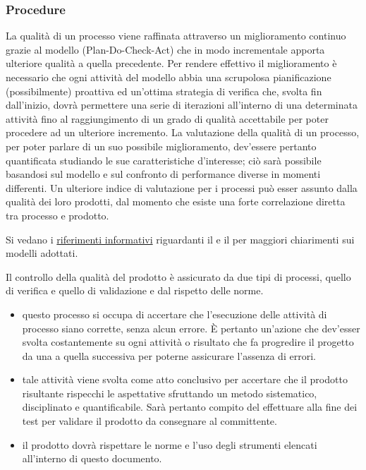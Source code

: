 \documentclass[a4paper, titlepage]{article}
\begin{document}
\subsubsection{Procedure}

La qualità di un processo viene raffinata attraverso un miglioramento continuo grazie al modello  (Plan-Do-Check-Act) che in modo incrementale apporta ulteriore qualità a quella precedente. Per rendere effettivo il miglioramento è necessario che ogni attività del modello abbia una scrupolosa pianificazione (possibilmente) proattiva ed un'ottima strategia di verifica che, svolta fin dall'inizio, dovrà permettere una serie di iterazioni all'interno di una determinata attività fino al raggiungimento di un grado di qualità accettabile per poter procedere ad un ulteriore incremento.
\newline La valutazione della qualità di un processo, per poter parlare di un suo possibile miglioramento, dev'essere pertanto quantificata studiando le sue caratteristiche d'interesse; ciò sarà possibile basandosi sul modello  e sul confronto di performance diverse in momenti differenti.
\newline Un ulteriore indice di valutazione per i processi può esser assunto dalla qualità dei loro prodotti, dal momento che esiste una forte correlazione diretta tra processo e prodotto.

Si vedano i \hyperref[rifinfo]{riferimenti informativi} riguardanti il  e il  per maggiori chiarimenti sui modelli adottati.

Il controllo della qualità del prodotto è assicurato da due tipi di processi, quello di verifica e quello di validazione e dal rispetto delle norme.
\begin{itemize}
	\item {} questo processo si occupa di accertare che l'esecuzione delle attività di processo siano corrette, senza alcun errore. È pertanto un'azione che dev'esser svolta costantemente su ogni attività o risultato che fa progredire il progetto da una  a quella successiva per poterne assicurare l'assenza di errori.
	\\
	\item {} tale attività viene svolta come atto conclusivo per accertare che il prodotto risultante rispecchi le aspettative sfruttando un metodo sistematico, disciplinato e quantificabile. Sarà pertanto compito del  effettuare alla fine dei test per validare il prodotto da consegnare al committente.
	\\
	\item {} il prodotto dovrà rispettare le norme e l'uso degli strumenti elencati all'interno di questo documento.
\end{itemize}
\end{document}
